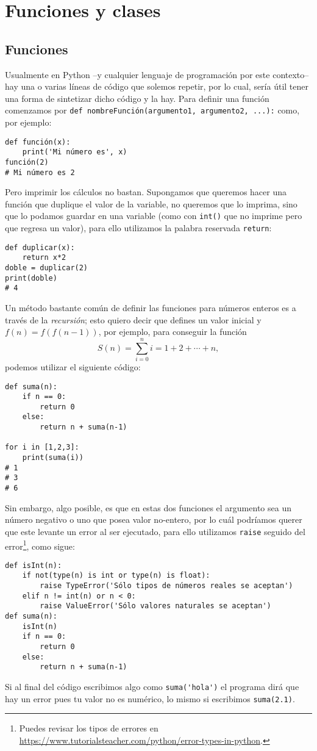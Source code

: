 \documentclass[11pt,twoside]{report}
\begin{document}
\chapter{Funciones y clases}
\section{Funciones}
Usualmente en Python --y cualquier lenguaje de programación por este contexto-- hay una o varias líneas de código que solemos repetir, por lo cual, sería útil tener una forma de sintetizar dicho código y la hay. Para definir una función comenzamos por \lstinline|def nombreFunción(argumento1, argumento2, ...):| como, por ejemplo:
\begin{lstlisting}
def función(x):
	print('Mi número es', x)
función(2)
# Mi número es 2
\end{lstlisting}
Pero imprimir los cálculos no bastan. Supongamos que queremos hacer una función que duplique el valor de la variable, no queremos que lo imprima, sino que lo podamos guardar en una variable (como con \lstinline|int()| que no imprime pero que regresa un valor), para ello utilizamos la palabra reservada \lstinline|return|:
\begin{lstlisting}
def duplicar(x):
	return x*2
doble = duplicar(2)
print(doble)
# 4
\end{lstlisting}
Un método bastante común de definir las funciones para números enteros es a través de la \textit{recursión}; esto quiero decir que defines un valor inicial y $f(n)=f(f(n-1))$, por ejemplo, para conseguir la función
$$S(n)=\sum_{i=0}^n i=1+2+\cdots+n,$$
podemos utilizar el siguiente código:
\begin{lstlisting}
def suma(n):
	if n == 0:
		return 0
	else:
		return n + suma(n-1)

for i in [1,2,3]:
	print(suma(i))
# 1
# 3
# 6
\end{lstlisting}
Sin embargo, algo posible, es que en estas dos funciones el argumento sea un número negativo o uno que posea valor no-entero, por lo cuál podríamos querer que este levante un error al ser ejecutado, para ello utilizamos \lstinline|raise| seguido del error\footnote{Puedes revisar los tipos de errores en \url{https://www.tutorialsteacher.com/python/error-types-in-python}.}, como sigue:
\begin{lstlisting}
def isInt(n):
	if not(type(n) is int or type(n) is float):
		raise TypeError('Sólo tipos de números reales se aceptan')
	elif n != int(n) or n < 0:
		raise ValueError('Sólo valores naturales se aceptan')
def suma(n):
	isInt(n)
	if n == 0:
		return 0
	else:
		return n + suma(n-1)
\end{lstlisting}
Si al final del código escribimos algo como \lstinline|suma('hola')| el programa dirá que hay un error  pues tu valor no es numérico, lo mismo si escribimos \lstinline|suma(2.1)|.
\end{document}
